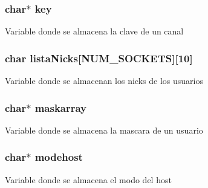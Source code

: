 \subsubsection[{\texorpdfstring{key}{key}}]{\setlength{\rightskip}{0pt plus 5cm}char$\ast$ key}\hypertarget{_g-2361-06-_p1-_server_8c_a5892a9181e6a332f84d27aecd41dcd12}{}\label{_g-2361-06-_p1-_server_8c_a5892a9181e6a332f84d27aecd41dcd12}
Variable donde se almacena la clave de un canal 
\subsubsection[{\texorpdfstring{lista\+Nicks}{listaNicks}}]{\setlength{\rightskip}{0pt plus 5cm}char lista\+Nicks\mbox{[}{\bf N\+U\+M\+\_\+\+S\+O\+C\+K\+E\+TS}\mbox{]}\mbox{[}10\mbox{]}}\hypertarget{_g-2361-06-_p1-_server_8c_a713172366a6be2fbf8456a4b43702603}{}\label{_g-2361-06-_p1-_server_8c_a713172366a6be2fbf8456a4b43702603}
Variable donde se almacenan los nicks de los usuarios 
\subsubsection[{\texorpdfstring{maskarray}{maskarray}}]{\setlength{\rightskip}{0pt plus 5cm}char$\ast$ maskarray}\hypertarget{_g-2361-06-_p1-_server_8c_ad51a4303b7c769561b12bf04a68bc042}{}\label{_g-2361-06-_p1-_server_8c_ad51a4303b7c769561b12bf04a68bc042}
Variable donde se almacena la mascara de un usuario 
\subsubsection[{\texorpdfstring{modehost}{modehost}}]{\setlength{\rightskip}{0pt plus 5cm}char$\ast$ modehost}\hypertarget{_g-2361-06-_p1-_server_8c_a4f28f55d19ac069eabc38c224c3a4225}{}\label{_g-2361-06-_p1-_server_8c_a4f28f55d19ac069eabc38c224c3a4225}
Variable donde se almacena el modo del host 
